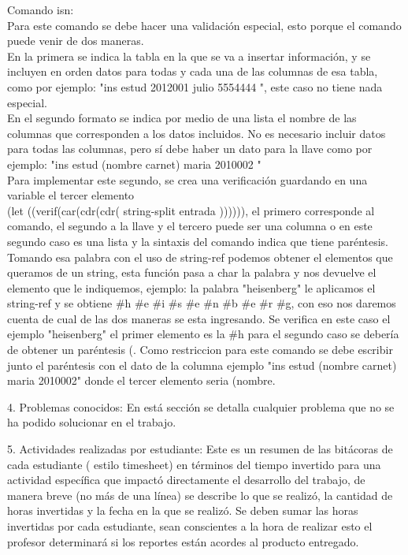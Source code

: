 \documentclass[12pt,a4paper]{report}
\begin{document}
\begin{flushleft}
Comando isn:\\
Para este comando se debe hacer una validación especial, esto porque el comando puede venir de dos maneras.\\
En la primera se indica la tabla en la que se va a insertar información, y se incluyen en orden datos para todas y cada una de las columnas de esa tabla, como por ejemplo:
"ins estud 2012001 julio 5554444 ", este caso no tiene nada especial.\\
En el segundo formato se indica por medio de una lista el nombre de las columnas que corresponden a los datos incluidos. No es necesario incluir datos para todas las
columnas, pero sí debe haber un dato para la llave como por ejemplo: "ins estud (nombre carnet) maria 2010002 "\\
Para implementar este segundo, se crea una verificación guardando en una variable el tercer elemento\\
(let ((verif(car(cdr(cdr( string-split entrada )))))), el primero corresponde al comando, el segundo a la llave y el tercero puede ser una columna o en este segundo caso es una lista y la sintaxis del comando indica que tiene paréntesis. Tomando esa palabra con el uso de string-ref podemos obtener el elementos que queramos de un string, esta función pasa a char la palabra y nos devuelve el elemento que le indiquemos, ejemplo: la palabra "heisenberg" le aplicamos el string-ref y se obtiene $\#$h $\#$e $\#$i $\#$s $\#$e $\#$n $\#$b $\#$e $\#$r $\#$g, con eso nos daremos cuenta de cual de las dos maneras se esta ingresando. Se verifica en este caso el ejemplo "heisenberg" el primer elemento es la $\#$h para el segundo caso se debería de obtener un paréntesis (. Como restriccion para este comando se debe escribir junto el paréntesis con el dato de la columna ejemplo "ins estud (nombre carnet) maria 2010002" donde el tercer elemento seria (nombre.\\



\end{flushleft}

\begin{flushleft}

4. Problemas conocidos: En está sección se detalla cualquier problema que no se ha podido solucionar en el trabajo.

\end{flushleft}

\begin{flushleft}
5. Actividades realizadas por estudiante: Este es un resumen de las bitácoras
de cada estudiante ( estilo timesheet) en términos del tiempo invertido para
una actividad específica que impactó directamente el desarrollo del trabajo,
de manera breve (no más de una línea) se describe lo que se realizó, la
cantidad de horas invertidas y la fecha en la que se realizó. Se deben sumar
las horas invertidas por cada estudiante, sean conscientes a la hora de
realizar esto el profesor determinará si los reportes están acordes al
producto entregado.

\end{flushleft}
\end{document}
